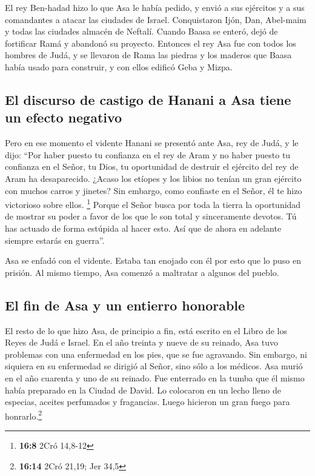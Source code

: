  El rey Ben-hadad hizo lo que Asa le había pedido, y envió
a sus ejércitos y a sus comandantes a atacar las ciudades de Israel.
Conquistaron Ijón, Dan, Abel-maim y todas las ciudades almacén de
Neftalí.  Cuando Baasa se enteró, dejó de fortificar Ramá
y abandonó su proyecto.  Entonces el rey Asa fue con todos
los hombres de Judá, y se llevaron de Rama las piedras y los maderos que
Baasa había usado para construir, y con ellos edificó Geba y Mizpa.

\hypertarget{el-discurso-de-castigo-de-hanani-a-asa-tiene-un-efecto-negativo}{%
\subsection{El discurso de castigo de Hanani a Asa tiene un efecto
negativo}\label{el-discurso-de-castigo-de-hanani-a-asa-tiene-un-efecto-negativo}}

 Pero en ese momento el vidente Hanani se presentó ante
Asa, rey de Judá, y le dijo: ``Por haber puesto tu confianza en el rey
de Aram y no haber puesto tu confianza en el Señor, tu Dios, tu
oportunidad de destruir el ejército del rey de Aram ha desaparecido.
 ¿Acaso los etíopes y los libios no tenían un gran
ejército con muchos carros y jinetes? Sin embargo, como confiaste en el
Señor, él te hizo victorioso sobre ellos. \footnote{\textbf{16:8} 2Cró
  14,8-12}  Porque el Señor busca por toda la tierra la
oportunidad de mostrar su poder a favor de los que le son total y
sinceramente devotos. Tú has actuado de forma estúpida al hacer esto.
Así que de ahora en adelante siempre estarás en guerra''.

 Asa se enfadó con el vidente. Estaba tan enojado con él
por esto que lo puso en prisión. Al mismo tiempo, Asa comenzó a
maltratar a algunos del pueblo.

\hypertarget{el-fin-de-asa-y-un-entierro-honorable}{%
\subsection{El fin de Asa y un entierro
honorable}\label{el-fin-de-asa-y-un-entierro-honorable}}

 El resto de lo que hizo Asa, de principio a fin, está
escrito en el Libro de los Reyes de Judá e Israel.  En el
año treinta y nueve de su reinado, Asa tuvo problemas con una enfermedad
en los pies, que se fue agravando. Sin embargo, ni siquiera en su
enfermedad se dirigió al Señor, sino sólo a los médicos. 
Asa murió en el año cuarenta y uno de su reinado.  Fue
enterrado en la tumba que él mismo había preparado en la Ciudad de
David. Lo colocaron en un lecho lleno de especias, aceites perfumados y
fragancias. Luego hicieron un gran fuego para honrarlo.\footnote{\textbf{16:14}
  2Cró 21,19; Jer 34,5}

